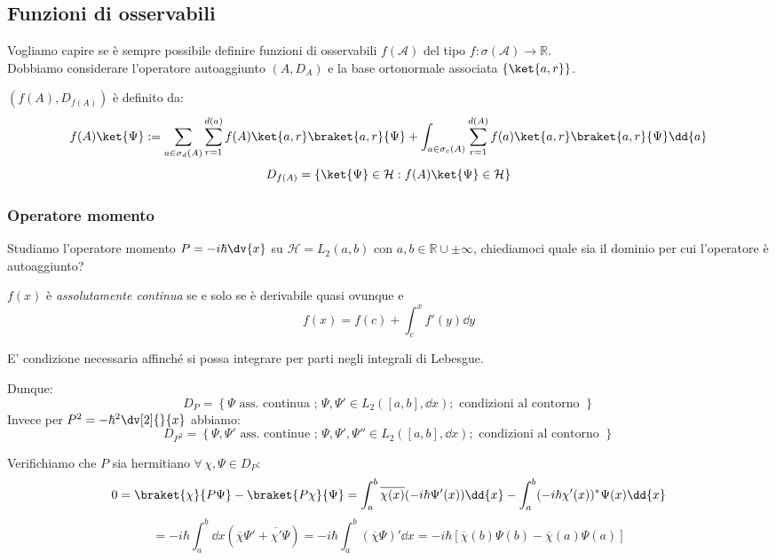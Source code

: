 \subsection{Funzioni di osservabili}

Vogliamo capire se è sempre possibile definire funzioni di osservabili \(f(\mathcal{A})\) del tipo \(f : \sigma(\mathcal{A})\to \mathbb{R}\).\\
Dobbiamo considerare l'operatore autoaggiunto \((A, D_A)\) e la base ortonormale associata \(\left\{ \ket{a,r} \right\}\).

\begin{definition}
    \((f(A), D_{f(A)})\) è definito da:
    \begin{equation}
        f(A)\ket{\Psi}:= \sum_{a \in \sigma_d(A)} \sum_{r=1}^{d(a)} f(A)\ket{a,r}\braket{a,r}{\Psi} + 
        \int_{a \in \sigma_c(A)} \sum_{r=1}^{d(A)} f(a)\ket{a,r}\braket{a,r}{\Psi} \dd{a}
    \end{equation}
    \[
      D_{f(A)} = \left\{ \ket{\Psi} \in \mathcal{H} : f(A)\ket{\Psi} \in \mathcal{H} \right\}  
    \]
\end{definition}


\subsubsection{Operatore momento}
Studiamo l'operatore momento \(P = -i\hbar \dv{x}\) su \(\mathcal{H} = L_2 ( a, b)\) con \(a,b \in \mathbb{R}\cup \pm \infty\), 
chiediamoci quale sia il dominio per cui l'operatore è autoaggiunto?

\begin{definition}
    \(f(x)\) è \textit{assolutamente continua} se e solo se è derivabile quasi ovunque e \[
        f(x) = f(c)+ \int_{c}^{x}f'(y) \dd{y}
    \]
\end{definition}

\begin{remark}
    E' condizione necessaria affinché si possa integrare per parti negli integrali di Lebesgue.
\end{remark}

Dunque:
\[
    D_P= \left\{ \Psi \text{ ass. continua } ;\, \Psi, \Psi' \in L_2([a,b],\dd{x}); \text{ condizioni al contorno }\right\}
\]
Invece per \(P^2 = -\hbar^2 \dv[2]{}{x}\) abbiamo:
\[
    D_{P^2} = \left\{ \Psi, \Psi' \text{ ass. continue } ; \, \Psi,\Psi',\Psi'' \in L_2([a,b],\dd{x}); \text{ condizioni al contorno }\right\}
\]

Verifichiamo che \(P\) sia hermitiano \(\forall\, \chi, \Psi \in D_P\):
\[
    0 = \braket{\chi}{P\Psi} - \braket{P\chi}{\Psi} =   \int_{a}^{b} \overline{\chi(x)}(-i\hbar \Psi'(x))\dd{x} - \int_{a}^{b}(-i\hbar \chi'(x))^* \Psi(x) \dd{x}
\]
\[
    = -i\hbar \int_{a}^{b}\dd{x} ( \overline{\chi}\Psi' + \overline{\chi'}\Psi)= -i\hbar\int_{a}^{b}( \overline{\chi}\Psi)' \dd{x}   = -i\hbar\left[ \overline{\chi}(b)\Psi(b)- \overline{\chi}(a)\Psi(a) \right]
\]

